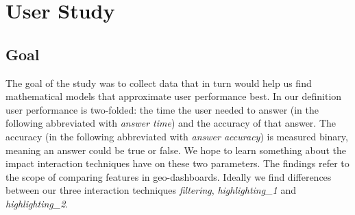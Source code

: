 \chapter{User Study}

\section{Goal}
The goal of the study was to collect data that in turn would help us find mathematical models that approximate user performance best. In our
definition user performance is two-folded: the time the user needed to answer (in the following abbreviated with \textit{answer time}) and the
accuracy of that answer. The accuracy (in the following abbreviated with \textit{answer accuracy}) is measured binary, meaning an answer could
be true or false. We hope to learn something about the impact interaction techniques have on these two parameters. The findings refer to the scope
of comparing features in geo-dashboards. Ideally we find differences between our three interaction techniques \textit{filtering}, \textit{highlighting\_1}
and \textit{highlighting\_2}.

